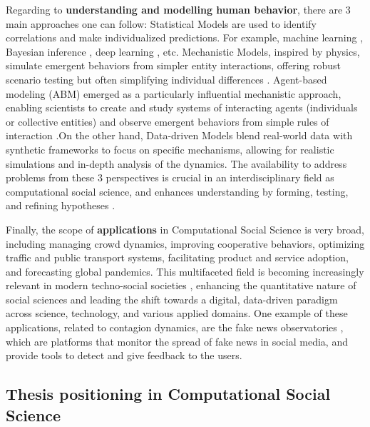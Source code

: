 Regarding to \textbf{understanding and modelling human behavior}, there are 3 main approaches one can follow: Statistical Models are used to identify correlations and make individualized predictions. For example, machine learning \cite{murphy-2012}, Bayesian inference \cite{gelman1995bayesian}, deep learning \cite{goodfellow-2016}, etc. Mechanistic Models, inspired by physics, simulate emergent behaviors from simpler entity interactions, offering robust scenario testing but often simplifying individual differences \cite{axelrod2006agent}. Agent-based modeling (ABM) emerged as a particularly influential mechanistic approach, enabling scientists to create and study systems of interacting agents (individuals or collective entities) and observe emergent behaviors from simple rules of interaction \cite{epstein1999agent}.On the other hand, Data-driven Models blend real-world data with synthetic frameworks to focus on specific mechanisms, allowing for realistic simulations and in-depth analysis of the dynamics. The availability to address problems from these 3 perspectives is crucial in an interdisciplinary field as computational social science, and enhances understanding by forming, testing, and refining hypotheses \cite{watts2004new}.

Finally, the scope of \textbf{applications} in Computational Social Science is very broad, including managing crowd dynamics, improving cooperative behaviors, optimizing traffic and public transport systems, facilitating product and service adoption, and forecasting global pandemics. This multifaceted field is becoming increasingly relevant in modern techno-social societies \cite{vespignani2009predicting}, enhancing the quantitative nature of social sciences and leading the shift towards a digital, data-driven paradigm across science, technology, and various applied domains. One example of these applications, related to contagion dynamics, are the fake news observatories \cite{Polis-observatory, EDMO-observatory, committed-observatory-2023}, which are platforms that monitor the spread of fake news in social media, and provide tools to detect and give feedback to the users.

\subsection{Thesis positioning in Computational Social Science\label{subsec:Thesis positioning in Computational Social Science}}

